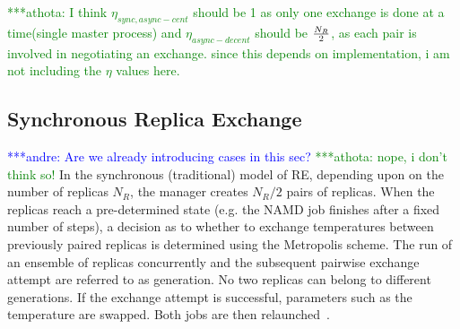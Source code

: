 \documentclass{rspublic}
\newcommand{\alnote}[1]{ {\textcolor{blue} { ***andre: #1 }}}
\newcommand{\athotanote}[1]{ {\textcolor{green} { ***athota: #1 }}}
\newcommand{\alnote}[1]{}
\newcommand{\athotanote}[1]{}
\begin{document}









\athotanote{I think $\eta_{sync,async-cent}$ should be 1 as only one exchange is done at a time(single master process) and $\eta_{async-decent}$ should be $N_R \over 2$, as each pair is involved in negotiating an exchange. since this depends on implementation, i am not including the $\eta$ values here.}




\subsection{Synchronous Replica Exchange}

\alnote{Are we already introducing cases in this sec?} \athotanote{nope, i don't think so!}
In the synchronous (traditional) model of RE, depending upon
on the number of replicas ${N_R}$, the manager creates ${N_R/2}$ pairs
of replicas. When the replicas reach a
pre-determined state (e.g. the NAMD job finishes after a fixed number
of steps), a decision as to whether to exchange temperatures between
previously paired replicas is determined using the Metropolis scheme.
The run of an ensemble of replicas concurrently and the subsequent
pairwise exchange attempt are referred to as generation. No two
replicas can belong to different generations. If the exchange attempt
is successful, parameters such as the temperature are swapped. Both
jobs are then relaunched~\citep{Luckow:2008fp}.
\end{document}
